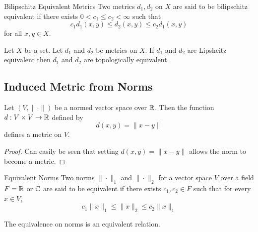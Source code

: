 \documentclass[a4paper]{article}
\begin{document}
\begin{defn}{Bilipschitz Equivalent Metrics}{} Two metrics $d_1,d_2$ on $X$ are said to be bilipschitz equivalent if there exists $0<c_1\leq c_2<\infty$ such that $$c_1d_1(x,y)\leq d_2(x,y)\leq c_2d_1(x,y)$$ for all $x,y\in X$. 
\end{defn}

\begin{lmm}{}{} Let $X$ be a set. Let $d_1$ and $d_2$ be metrics on $X$. If $d_1$ and $d_2$ are Lipshcitz equivalent then $d_1$ and $d_2$ are topologically equivalent. 
\end{lmm}

\subsection{Induced Metric from Norms}
\begin{prp}{}{} Let $(V,\|\cdot\|)$ be a normed vector space over $\mathbb{R}$. Then the function $d:V\times V\to\mathbb{R}$ defined by $$d(x,y)=\|x-y\|$$ defines a metric on $V$. \tcbline
\begin{proof} Can easily be seen that setting $d(x,y)=\|x-y\|$ allows the norm to become a metric. 
\end{proof}
\end{prp}

\begin{defn}{Equivalent Norms}{} Two norms $\|\cdot\|_1$ and $\|\cdot\|_2$ for a vector space $V$ over a field $F=\mathbb{R}$ or $\mathbb{C}$ are said to be equivalent if there exists $c_1,c_2\in F$ such that for every $x\in V$, $$c_1\|x\|_1\leq\|x\|_2\leq c_2\|x\|_1$$
\end{defn}

\begin{prp}{}{} The equivalence on norms is an equivalent relation. 
\end{prp}
\end{document}
